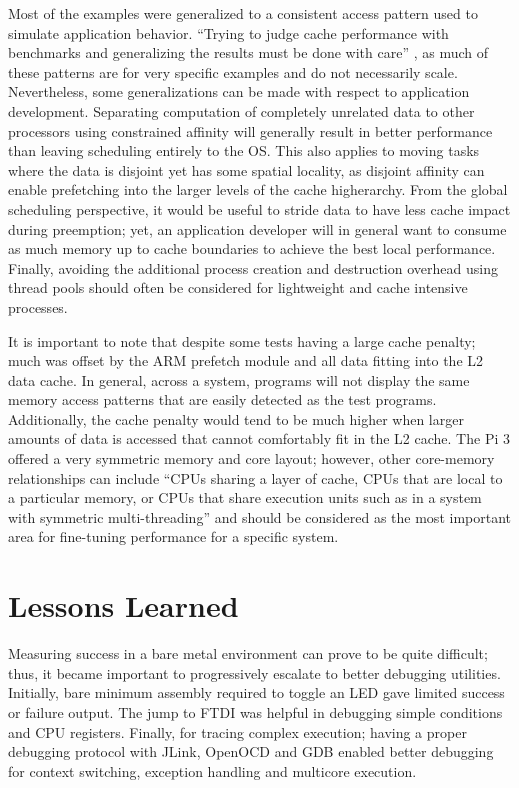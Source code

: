 \documentclass[11pt]{article}
\begin{document}
Most of the examples were generalized to a consistent access pattern used to simulate application behavior.  ``Trying to judge cache performance with benchmarks and generalizing the results must be done with care'' \cite{unix}, as much of these patterns are for very specific examples and do not necessarily scale.  Nevertheless, some generalizations can be made with respect to application development.  Separating computation of completely unrelated data to other processors using constrained affinity will generally result in better performance than leaving scheduling entirely to the OS.  This also applies to moving tasks where the data is disjoint yet has some spatial locality, as disjoint affinity can enable prefetching into the larger levels of the cache higherarchy.  From the global scheduling perspective, it would be useful to stride data to have less cache impact during preemption; yet, an application developer will in general want to consume as much memory up to cache boundaries to achieve the best local performance.  Finally, avoiding the additional process creation and destruction overhead using thread pools should often be considered for lightweight and cache intensive processes.

It is important to note that despite some tests having a large cache penalty; much was offset by the ARM prefetch module and all data fitting into the L2 data cache.  In general, across a system, programs will not display the same memory access patterns that are easily detected as the test programs.  Additionally, the cache penalty would tend to be much higher when larger amounts of data is accessed that cannot comfortably fit in the L2 cache.  The Pi 3 offered a very symmetric memory and core layout; however, other core-memory relationships can include ``CPUs sharing a layer of cache, CPUs that are local to a particular memory, or CPUs that share execution units such as in a system with symmetric multi-threading'' \cite{freebsd} and should be considered as the most important area for fine-tuning performance for a specific system.

\section{Lessons Learned}
\label{sec:lessons}
Measuring success in a bare metal environment can prove to be quite difficult; thus, it became important to progressively escalate to better debugging utilities.  Initially, bare minimum assembly required to toggle an LED gave limited success or failure output.  The jump to FTDI was helpful in debugging simple conditions and CPU registers.  Finally, for tracing complex execution; having a proper debugging protocol with JLink, OpenOCD and GDB enabled better debugging for context switching, exception handling and multicore execution.
\end{document}
